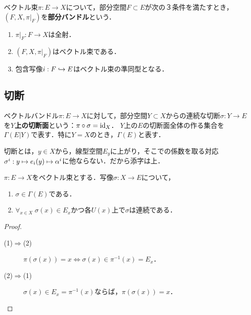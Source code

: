 \documentclass[uplatex,dvipdfmx]{jsreport}
\begin{document}
\begin{definition}[部分バンドル]
    ベクトル束$\pi:E\to X$について，部分空間$F\subset E$が次の３条件を満たすとき，$(F,X,\pi|_{F})$を\textbf{部分バンドル}という．
    \begin{enumerate}
        \item $\pi|_F:F\to X$は全射．
        \item $(F,X,\pi|_{F})$はベクトル束である．
        \item 包含写像$i:F\hookrightarrow E$はベクトル束の準同型となる．
    \end{enumerate}
\end{definition}

\subsection{切断}

\begin{definition}[section]
    ベクトルバンドル$\pi:E\to X$に対して，部分空間$Y\subset X$からの連続な切断$\sigma:Y\to E$を\textbf{$Y$上の切断面}という：$\pi\circ\sigma=\mathrm{id}_X$．
    $Y$上の$E$の切断面全体の作る集合を$\Gamma(E|Y)$で表す．特に$Y=X$のとき，$\Gamma(E)$と表す．
\end{definition}
\begin{remarks}
    切断とは，$y\in X$から，線型空間$E_y$に上がり，そこでの係数を取る対応
    $\sigma^i:y\mapsto e_i(y)\mapsto \alpha^i$に他ならない．だから添字は上．
\end{remarks}

\begin{lemma}[切断の特徴付け]
    $\pi:E\to X$をベクトル束とする．写像$\sigma:X\to E$について，
    \begin{enumerate}
        \item $\sigma\in\Gamma(E)$である．
        \item $\forall_{x\in X}\;\sigma(x)\in E_x$かつ各$U(x)$上で$\sigma$は連続である．
    \end{enumerate}
\end{lemma}
\begin{proof}\mbox{}
    \begin{description}
        \item[(1)$\Rightarrow$(2)] $\pi(\sigma(x))=x\Leftrightarrow\sigma(x)\in\pi^{-1}(x)=E_x$．
        \item[(2)$\Rightarrow$(1)] $\sigma(x)\in E_x=\pi^{-1}(x)$ならば，$\pi(\sigma(x))=x$．
    \end{description}
\end{proof}
\end{document}
